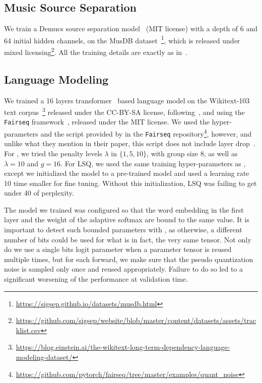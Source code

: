 \subsection{Music Source Separation}

We train a Demucs source separation model~\citep{defossez2019music} (MIT license) with a depth of 6 and 64 initial hidden channels, on the MusDB dataset~\citep{musdb}\footnote{\url{https://sigsep.github.io/datasets/musdb.html}}, which is released under mixed licensing\footnote{\url{https://github.com/sigsep/website/blob/master/content/datasets/assets/tracklist.csv}}. 
All the training details are exactly as in~\citep{defossez2019music}.

\subsection{Language Modeling}

We trained a 16 layers transformer~\citep{vaswani2017attention} based language model on the Wikitext-103 text corpus~\citep{merity2016pointer}\footnote{\url{https://blog.einstein.ai/the-wikitext-long-term-dependency-language-modeling-dataset/}} released under the CC-BY-SA license,
following~\citet{baevski2018adaptive},
 and using the \texttt{Fairseq} framework~\citep{ott2019fairseq}, released under the MIT license. 
 We used the hyper-parameters and the script provided by \citep{fan2020training} in the \texttt{Fairseq} repository\footnote{\url{https://github.com/pytorch/fairseq/tree/master/examples/quant_noise}}, however, and unlike what they mention in their paper, this script does not include layer drop~\citep{fan2019reducing}.
 For \diffq, we tried the penalty levels $\lambda$ in $\{1, 5, 10\}$, with group size $8$, as well as $\lambda = 10$ and $g = 16$.
 For LSQ, we used the same training hyper-parameters as \diffq, except we initialized the model
 to a pre-trained model and used a learning rate 10 time smaller for fine tuning. Without this initialization, LSQ was failing to get under 40 of perplexity.

The model we trained was configured so that the word embedding in the first layer and the weight of the adaptive softmax are bound to the same value. It is important to detect such bounded parameters with \diffq, as otherwise, a different number of bits could be used for what is in fact, the very same tensor. Not only do we use a single bits logit parameter
when a parameter tensor is reused multiple times, but for each forward, we make sure that the pseudo quantization noise
is sampled only once and reused appropriately. Failure to do so led to a significant worsening of the performance
at validation time.


